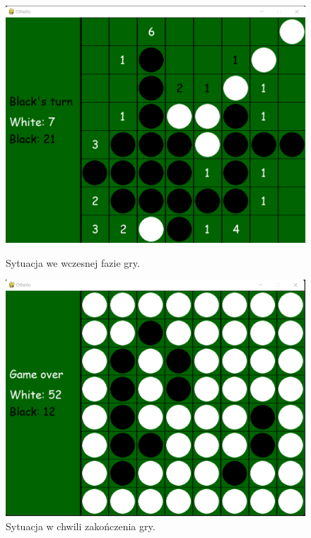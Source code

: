 \documentclass[10pt]{article}
\begin{document}
\begin{figure}[H]
  \centering
  \begin{minipage}{0.49\textwidth}
    \includegraphics[width=\textwidth]{images/UCT_win_before.png}
    \caption{Sytuacja we wczesnej fazie gry.}
    \label{fig:strategia_uct1}

  \end{minipage}
  \begin{minipage}{0.49\textwidth}
    \includegraphics[width=\textwidth]{images/uct_win_after.png}
    \caption{Sytuacja w chwili zakończenia gry.}
    \label{fig:strategia_uct2}
  \end{minipage}
\end{figure}
\end{document}
